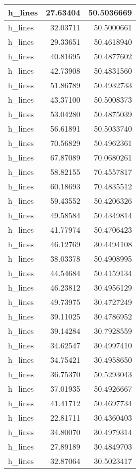 \documentclass[
]{book}
\theoremstyle{definition}
\theoremstyle{definition}
\theoremstyle{definition}
\theoremstyle{definition}
\theoremstyle{remark}
\begin{document}
\begin{tabular}{l|r|r}
\hline
h\_lines & 27.63404 & 50.5036669\\
\hline
h\_lines & 32.03711 & 50.5000661\\
\hline
h\_lines & 29.33651 & 50.4618940\\
\hline
h\_lines & 40.81695 & 50.4877602\\
\hline
h\_lines & 42.73908 & 50.4831560\\
\hline
h\_lines & 51.86789 & 50.4932733\\
\hline
h\_lines & 43.37100 & 50.5008373\\
\hline
h\_lines & 53.04280 & 50.4875039\\
\hline
h\_lines & 56.61891 & 50.5033740\\
\hline
h\_lines & 70.56829 & 50.4962361\\
\hline
h\_lines & 67.87089 & 70.0680261\\
\hline
h\_lines & 58.82155 & 70.4557817\\
\hline
h\_lines & 60.18693 & 70.4835512\\
\hline
h\_lines & 59.43552 & 50.4206326\\
\hline
h\_lines & 49.58584 & 50.4349814\\
\hline
h\_lines & 41.77974 & 50.4706423\\
\hline
h\_lines & 46.12769 & 30.4494108\\
\hline
h\_lines & 38.03378 & 50.4908995\\
\hline
h\_lines & 44.54684 & 50.4159134\\
\hline
h\_lines & 46.23812 & 30.4956129\\
\hline
h\_lines & 49.73975 & 30.4727249\\
\hline
h\_lines & 39.11025 & 30.4786952\\
\hline
h\_lines & 39.14284 & 30.7928559\\
\hline
h\_lines & 34.62547 & 30.4997410\\
\hline
h\_lines & 34.75421 & 30.4958650\\
\hline
h\_lines & 36.75370 & 50.5293043\\
\hline
h\_lines & 37.01935 & 50.4926667\\
\hline
h\_lines & 41.41712 & 50.4697734\\
\hline
h\_lines & 22.81711 & 30.4360403\\
\hline
h\_lines & 34.80070 & 30.4979314\\
\hline
h\_lines & 27.89189 & 30.4849703\\
\hline
h\_lines & 32.87064 & 30.5023417\\

\end{tabular}
\end{document}
